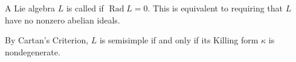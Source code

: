 A Lie algebra $L$ is called  if $\operatorname{Rad} L = 0$. This is equivalent to requiring that $L$ have no nonzero abelian ideals. 

By Cartan's Criterion, $L$ is semisimple if and only if its Killing form $\kappa$ is nondegenerate.
